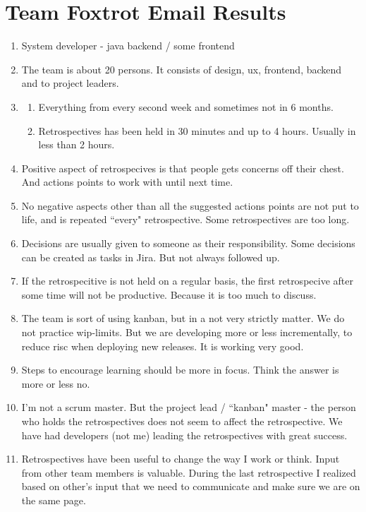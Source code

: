 \chapter{Team Foxtrot Email Results}
\begin{enumerate}
\item System developer - java backend / some frontend
\item The team is about 20 persons. It consists of design, ux, frontend, backend and to project leaders.
\item \begin{enumerate}
	\item Everything from every second week and sometimes not in 6 months.
	\item Retrospectives has been held in 30 minutes and up to 4 hours. Usually in less than 2 hours.
	\end{enumerate}
\item Positive aspect of retrospecives is that people gets concerns off their chest. And actions points to work with until next time.
\item No negative aspects other than all the suggested actions points are not put to life, and is repeated ``every" retrospective. Some retrospectives are too long.
\item Decisions are usually given to someone as their responsibility. Some decisions can be created as tasks in Jira. But not always followed up. 
\item If the retrospecitive is not held on a regular basis, the first retrospecive after some time will not be productive. Because it is too much to discuss.
\item The team is sort of using kanban, but in a not very strictly matter. We do not practice wip-limits. But we are developing more or less incrementally, to reduce risc when deploying new releases. It is working very good.
\item Steps to encourage learning should be more in focus. Think the answer is more or less no.
\item I'm not a scrum master. But the project lead / ``kanban" master - the person who holds the retrospectives does not seem to affect the retrospective. We have had developers (not me) leading the retrospectives with great success.
\item Retrospectives have been useful to change the way I work or think. Input from other team members is valuable. During the last retrospective I realized based on other's input that we need to communicate and make sure we are on the same page.

\end{enumerate}
